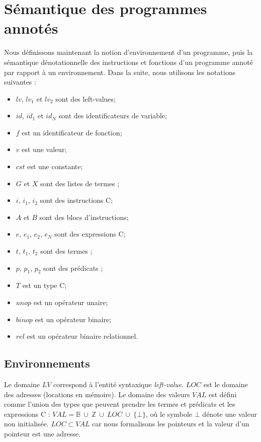 \section{Sémantique des programmes annotés}
\label{sec:lang-semantics}


Nous définissons maintenant la notion d'environnement d'un programme, puis la
sémantique dénotationnelle des instructions et fonctions d'un programme
annoté par rapport à un environnement.
Dans la suite, nous utilisons les notations suivantes :
\begin{itemize}
\item $\mathit{lv}$, $\mathit{lv_1}$ et $\mathit{lv_2}$ sont des left-values;
\item $\mathit{id}$, $\mathit{id_1}$ et $\mathit{id_N}$ sont des identificateurs
  de variable;
\item $f$ est un identificateur de fonction;
\item $v$ est une valeur;
\item $\mathit{cst}$ est une constante;
\item $G$ et $X$ sont des listes de termes \eacsl;
\item $i$, $i_1$, $i_2$ sont des instructions C;
\item $A$ et $B$ sont des blocs d'instructions;
\item $e$, $e_1$, $e_2$, $e_N$ sont des expressions C;
\item $t$, $t_1$, $t_2$ sont des termes \eacsl;
\item $p$, $p_1$, $p_2$ sont des prédicats \eacsl;
\item $T$ est un type C;
\item $\mathit{unop}$ est un opérateur unaire;
\item $\mathit{binop}$ est un opérateur binaire;
\item $\mathit{rel}$ est un opérateur binaire relationnel.
\end{itemize}


\subsection{Environnements}


Le domaine $LV$ correspond à l'entité syntaxique \textit{left-value}.
$LOC$ est le domaine des adresses (locations en mémoire).
Le domaine des valeurs $VAL$ est défini comme l'union des types que
peuvent prendre les termes et prédicats \eacsl et les expressions C :
$VAL = \mathbb{B}~\cup~\mathbb{Z}~\cup~LOC~\cup~\{\bot\}$, où le symbole
$\bot$ dénote une valeur non initialisée.
$LOC \subset VAL$ car nous formalisons les pointeurs et la valeur d'un pointeur
est une adresse.

